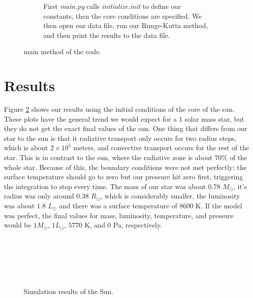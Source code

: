 \documentclass[10pt]{article}
\begin{document}
\begin{figure}[htbp]

 \begin{subfigure}{\textwidth}
  
  
  
  
  \caption{First \emph{main.py} calls \emph{initialize.init} to define our constants, then the core conditions are specified. We then open our data file, run our Runge-Kutta method, and then print the results to the data file.}
 \end{subfigure}
 \caption{main method of the code.}
 \label{fig:code}
\end{figure}

\section{Results}
Figure \ref{fig:sun} shows our results using the initial conditions of the core of the sun. These plots have the general trend we would expect for a 1 solar mass star, but they do not get the exact final values of the sun. One thing that differs from our star to the sun is that it radiative transport only occurs for two radius steps, which is about $2\times 10^5$ meters, and convective transport occurs for the rest of the star. This is in contrast to the sun, where the radiative zone is about 70\% of the whole star. Because of this, the boundary conditions were not met perfectly; the surface temperature should go to zero but our pressure hit zero first, triggering the integration to stop every time. The mass of our star was about 0.78 $M_\odot$, it's radius was only around 0.38 $R_\odot$, which is considerably smaller, the luminosity was about 1.8 $ L_\odot$ and there was a surface temperature of 8600 K. If the model was perfect, the final values for mass, luminosity, temperature, and pressure would be $1 M_\odot$, $1 L_\odot$, $5770$ K, and $0$ Pa, respectively. \\

\begin{figure}[p]
\begin{centering}
 \begin{subfigure}{\textwidth}
  
 \end{subfigure} \\
 \begin{subfigure}{\textwidth}
  
 \end{subfigure} \\
  \begin{subfigure}{\textwidth}
  
 \end{subfigure} \\
   \begin{subfigure}{\textwidth}
  
 \end{subfigure}
 \caption{Simulation results of the Sun.}
 \label{fig:sun}
 \end{centering}
\end{figure}
\end{document}
